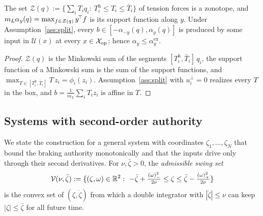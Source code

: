 \begin{lemma}\label{lem:support}
The set $\mathcal{Z}(q):=\{\sum_iT_iq_i:\ T^{\mathrm h}_i\le T_i\le\bar T_i\}$ of tension forces is a zonotope, and $m_L\alpha_y(q)=\max_{f\in\mathcal{Z}(q)}y^{\!\top} f$ is its support function along $y$. Under Assumption~\ref{ass:split}, every $b\in[-\alpha_{-y}(q),\alpha_y(q)]$ is produced by some input in $\mathcal{U}(x)$ at every $x\in\mathcal{X}_{\mathrm{op}}$; hence $\alpha_y\le\alpha^{\mathrm{ex}}_y$.
\end{lemma}
\begin{proof}
$\mathcal{Z}(q)$ is the Minkowski sum of the segments $[T^{\mathrm h}_i,\bar T_i]\,q_i$, the support function of a Minkowski sum is the sum of the support functions, and $\max_{T\in[T^{\mathrm h}_i,\bar T_i]}T\,z_i=\phi_i(z_i)$. Assumption~\ref{ass:split} with $u_i^\perp=0$ realizes every $T$ in the box, and $b=\frac{1}{m_L}\sum_iT_iz_i$ is affine in $T$.
\end{proof}

\subsection{Systems with second-order authority}\label{sec:class}

We state the construction for a general system with coordinates $\zeta_1,\dots,\zeta_N$ that bound the braking authority monotonically and that the inputs drive only through their second derivatives. For $\nu,\bar\zeta>0$, the \emph{admissible swing set}
\begin{equation}
\mathcal{V}(\nu,\bar\zeta):=\{(\zeta,\omega)\in\R^2:\ -\bar\zeta+\tfrac{\negp{\omega}^2}{2\nu}\le\zeta\le\bar\zeta-\tfrac{\pos{\omega}^2}{2\nu}\}
\label{eq:box}
\end{equation}
is the convex set of $(\zeta,\dot\zeta)$ from which a double integrator with $|\ddot\zeta|\le\nu$ can keep $|\zeta|\le\bar\zeta$ for all future time.

